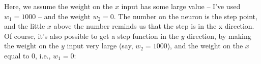 \documentclass[a4paper,twoside,10pt]{book}
\begin{document}
\begin{center}
\end{center}
Here, we assume the weight on the $x$ input has some large value -- I've used $w_1=1000$ -- and the weight $w_2=0$. The number on the neuron is the step point, and the little $x$ above the number reminds us that the step is in the x direction. Of course, it's also possible to get a step function in the $y$ direction, by making the weight on the $y$ input very large (say, $w_2=1000$), and the weight on the $x$ equal to 0, i.e., $w_1=0$:
\end{document}
